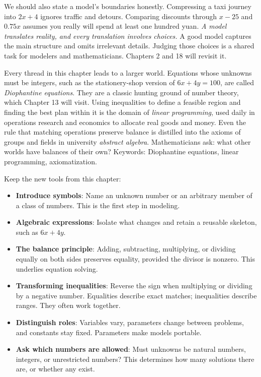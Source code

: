 We should also state a model's boundaries honestly. Compressing a taxi journey into $2x+4$ ignores traffic and detours. Comparing discounts through $x-25$ and $0.75x$ assumes you really will spend at least one hundred yuan. \emph{A model translates reality, and every translation involves choices.} A good model captures the main structure and omits irrelevant details. Judging those choices is a shared task for modelers and mathematicians. Chapters 2 and 18 will revisit it.

\begin{pandeng}
Every thread in this chapter leads to a larger world. Equations whose unknowns must be integers, such as the stationery-shop version of $6x+4y=100$, are called \emph{Diophantine equations}. They are a classic hunting ground of number theory, which Chapter 13 will visit. Using inequalities to define a feasible region and finding the best plan within it is the domain of \emph{linear programming}, used daily in operations research and economics to allocate real goods and money. Even the rule that matching operations preserve balance is distilled into the axioms of groups and fields in university \emph{abstract algebra}. Mathematicians ask: what other worlds have balances of their own? Keywords: Diophantine equations, linear programming, axiomatization.
\end{pandeng}

\begin{toolbox}
Keep the new tools from this chapter:
\begin{itemize}
\item \textbf{Introduce symbols}: Name an unknown number or an arbitrary member of a class of numbers. This is the first step in modeling.
\item \textbf{Algebraic expressions}: Isolate what changes and retain a reusable skeleton, such as $6x+4y$.
\item \textbf{The balance principle}: Adding, subtracting, multiplying, or dividing equally on both sides preserves equality, provided the divisor is nonzero. This underlies equation solving.
\item \textbf{Transforming inequalities}: Reverse the sign when multiplying or dividing by a negative number. Equalities describe exact matches; inequalities describe ranges. They often work together.
\item \textbf{Distinguish roles}: Variables vary, parameters change between problems, and constants stay fixed. Parameters make models portable.
\item \textbf{Ask which numbers are allowed}: Must unknowns be natural numbers, integers, or unrestricted numbers? This determines how many solutions there are, or whether any exist.
\end{itemize}
\end{toolbox}

